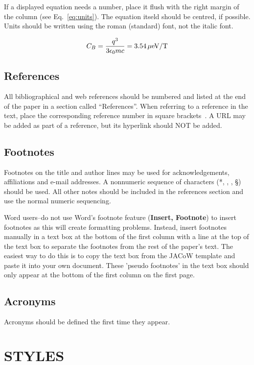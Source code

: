 \documentclass{JAC2003}
\begin{document}
If a displayed equation needs a number, place it flush with the right
margin of the column (see Eq.~\ref{eq:units}). The equation itseld should be centred, if possible.
Units should be written
using the roman (standard) font, not the italic font.

\begin{equation}\label{eq:units}
    C_B={q^3\over 3\epsilon_{0} mc}=3.54\,\hbox{$\mu$eV/T}
\end{equation}

\subsection{References}

All bibliographical and web references should be numbered and listed at the
end of the paper in a section called ``References''. When referring to a
reference in the text, place the corresponding reference number in square
brackets~\cite{exampl-ref}. A URL may be added as part of a reference, but 
its hyperlink should NOT be added.

\subsection{Footnotes}

Footnotes on the title and author lines may be used for acknowledgements,
affiliations and e-mail addresses. A nonnumeric sequence of characters (*,
\dag, \ddag, \S) should be used. All other notes should be included in the
references section and use the normal numeric sequencing.

Word users--do not use Word's footnote feature (\textbf{Insert, Footnote}) to insert
footnotes as this will create formatting problems. Instead, insert footnotes manually in a text box at the bottom of the first column with a line at the top of the text box to separate the footnotes from the rest of the paper's text.  The easiest way to do this is to copy the text box from the JACoW template and paste it into your own document.  These 'pseudo footnotes' in the text box should only appear at the bottom of the first column on the first page.

\subsection{Acronyms}

Acronyms should be defined the first time they appear.

\section{STYLES}
\end{document}
